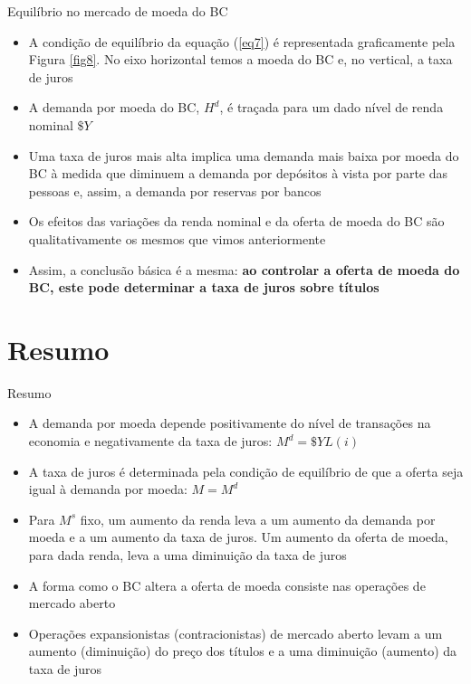 \documentclass[10pt]{beamer}
\begin{document}
\begin{frame}{Equilíbrio no mercado de moeda do BC}
    \begin{itemize}
        \item A condição de equilíbrio da equação (\ref{eq7}) é representada graficamente pela Figura \ref{fig8}. No eixo horizontal temos a moeda do BC e, no vertical, a taxa de juros
        \bigskip
        \item A demanda por moeda do BC, $H^d$, é traçada para um dado nível de renda nominal $\$ Y$
        \bigskip
        \item Uma taxa de juros mais alta implica uma demanda mais baixa por moeda do BC à medida que diminuem a demanda por depósitos à vista por parte das pessoas e, assim, a demanda por reservas por bancos
        \bigskip
        \item Os efeitos das variações da renda nominal e da oferta de moeda do BC são qualitativamente os mesmos que vimos anteriormente
        \bigskip
        \item Assim, a conclusão básica é a mesma: \textbf{ao controlar a oferta de moeda do BC, este pode determinar a taxa de juros sobre títulos}
    \end{itemize}
\end{frame}

\section{Resumo}
\begin{frame}{Resumo}
\begin{itemize}
    \item A demanda por moeda depende positivamente do nível de transações na economia e negativamente da taxa de juros: $M^d = \$YL(i)$
    \bigskip
    \item A taxa de juros é determinada pela condição de equilíbrio de que a oferta seja igual à demanda por moeda: $M = M^d$
    \bigskip
    \item Para $M^s$ fixo, um aumento da renda leva a um aumento da demanda por moeda e a um aumento da taxa de juros. Um aumento da oferta de moeda, para dada renda, leva a uma diminuição da taxa de juros
    \bigskip
    \item A forma como o BC altera a oferta de moeda consiste nas operações de mercado aberto
    \bigskip
    \item Operações expansionistas (contracionistas) de mercado aberto levam a um aumento (diminuição) do preço dos títulos e a uma diminuição (aumento) da taxa de juros
\end{itemize}    
\end{frame}
\end{document}
